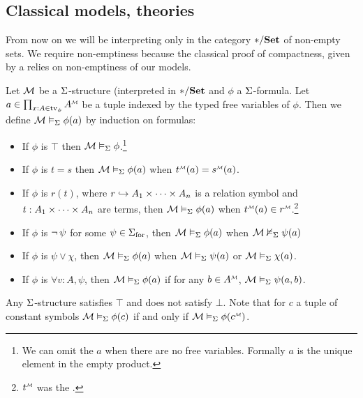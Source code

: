 \subsection{Classical models, theories}
From now on we will be interpreting only in the category $* / \mathbf{Set}$
of non-empty sets.
We require non-emptiness because the classical proof of compactness,
given by a 
relies on non-emptiness of our models.

\begin{dfn}[Satisfaction]
    Let $\mathcal{M}$ be a $\Sigma$-structure (interpreted in $* / \mathbf{Set}$
    and $\phi$ a $\Sigma$-formula.
    Let $a \in \prod_{x : A \in \tv{\phi}} \mmintp{A}$ be a tuple indexed by
    the typed free variables of $\phi$.
    Then we define $\mathcal{M} \vDash_{\Sigma} \phi(a)$ by induction on formulas:
    \begin{itemize}
        \item If $\phi$ is $\top$ then $\mathcal{M} \vDash_{\Sigma} \phi$.\footnote{
            We can omit the $a$ when there are no free variables.
            Formally $a$ is the unique element in the empty product.}
        \item If $\phi$ is $t = s$ then
            $\mathcal{M} \vDash_{\Sigma} \phi(a)$ when
            $\modintp{\MM}{t}(a) = \modintp{\MM}{s}(a)$.
            \item If $\phi$ is $r(t)$,
            where $r \hookrightarrow A_1 \times \dots \times A_n$ is a relation symbol and
            $t : A_1 \times \dots \times A_n$ are terms,
            then $\mathcal{M} \vDash_{\Sigma} \phi(a)$ when
            $\modintp{\MM}{t}(a) \in \modintp{\MM}{r}$.\footnote{
            $\modintp{\MM}{t}$ was the
            .
            }
            \vspace{1em}
        \item If $\phi$ is
            $\neg\,\psi$ for some $\psi \in {\Sigma}_\mathrm{for}$,
            then $\mathcal{M} \vDash_{\Sigma} \phi(a)$ when $\mathcal{M} \nvDash_{\Sigma} \psi(a)$
        \item If $\phi$ is  $\psi \lor \chi$,
            then $\mathcal{M} \vDash_{\Sigma} \phi(a)$ when
            $\mathcal{M} \vDash_{\Sigma} \psi(a)$ or $\mathcal{M} \vDash_{\Sigma} \chi(a)$.
        \item If $\phi$ is
            $\forall v : A, \psi$,
            then $\mathcal{M} \vDash_{\Sigma} \phi(a)$
            if for any $b \in \mmintp{A}$,
            $\mathcal{M} \vDash_{\Sigma} \psi(a,b)$.
    \end{itemize}
\end{dfn}

\begin{rmk}
    Any $\Sigma$-structure satisfies $\top$
    and does not satisfy $\bot$.
    Note that for $c$ a tuple of constant symbols
    $\mathcal{M} \vDash_{\Sigma} \phi(c)$ if and only if
    $\MM \model{\Si} \phi(\mmintp{c})$.
\end{rmk}

